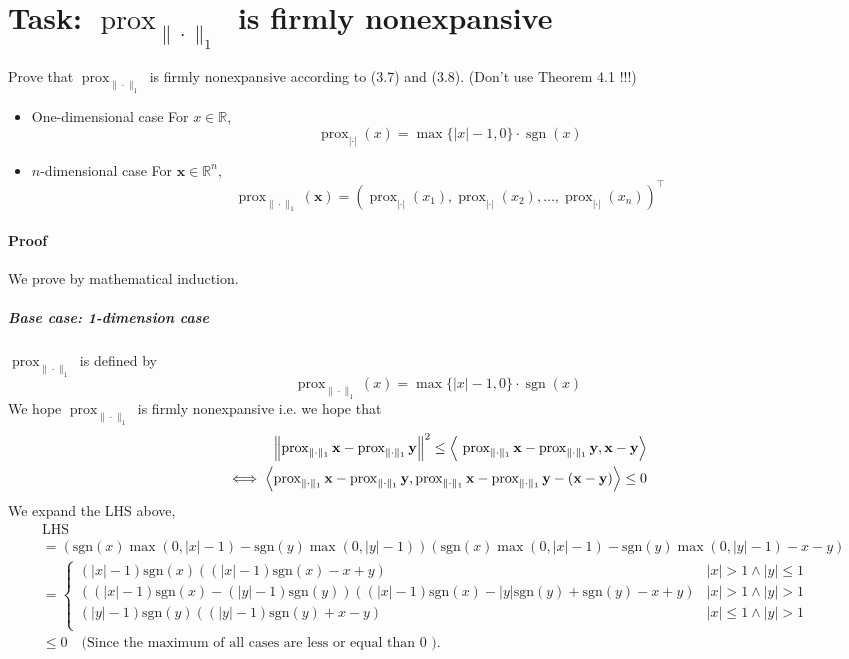 \documentclass[11pt]{article}
\def\bx{\bold x}
\def\by{\bold y}
\newcommand\norm[1]{\left\lVert#1\right\rVert}
\newcommand\vc[1]{\left\langle{#1}\right\rangle }
\def \pr{\operatorname{prox}_{\|\cdot\|_{1}}}
\begin{document}
\section{Task: $\operatorname{prox}_{\|\cdot\|_{1}}$ is firmly nonexpansive}  Prove that $\operatorname{prox}_{\|\cdot\|_{1}}$ is firmly nonexpansive according to (3.7) and (3.8). (Don't use Theorem 4.1 !!!)
\begin{itemize}
	\item One-dimensional case
For $x \in \mathbb{R}$,
$$
\operatorname{prox}_{|\cdot|}(x)=\max \{|x|-1,0\} \cdot \operatorname{sgn}(x)
$$
\item $n$-dimensional case
For $\boldsymbol{x} \in \mathbb{R}^{n}$,
$$
\operatorname{prox}_{\|\cdot\|_{1}}(\boldsymbol{x})=\left(\operatorname{prox}_{|\cdot|}\left(x_{1}\right), \operatorname{prox}_{|\cdot|}\left(x_{2}\right), \ldots, \operatorname{prox}_{|\cdot|}\left(x_{n}\right)\right)^{\top}
$$
\end{itemize}

\paragraph{Proof} We prove by mathematical induction.
\subparagraph{Base case: 1-dimension case}
$\pr$ is defined by
$$
\pr (x) = \max \{|x|-1,0\} \cdot \operatorname{sgn}(x)
$$
We hope $\pr$ is firmly nonexpansive i.e. we hope that
$$
\begin{aligned}
	\norm{\pr \bx - \pr \by}^2 \leq \vc{\ \pr \bx - \pr \by,\bx - \by} \\
\iff \vc{\pr \bx - \pr \by , \pr \bx - \pr \by - (\bx - \by ) }\leq 0
\end{aligned}
$$
We expand the LHS above,
$$
\begin{aligned}
	&\text{LHS} \\
	&= (\text{sgn}(x) \max (0,| x| -1)-\text{sgn}(y) \max (0,| y| -1)) (\text{sgn}(x) \max (0,| x| -1)-\text{sgn}(y) \max (0,| y| -1)-x-y) \\
	&=\begin{cases}
		 (| x| -1) \text{sgn}(x) ((| x| -1) \text{sgn}(x)-x+y) & | x| >1\land | y| \leq 1 \\
 ((| x| -1) \text{sgn}(x)-(| y| -1) \text{sgn}(y)) ((| x| -1) \text{sgn}(x)-| y|  \text{sgn}(y)+\text{sgn}(y)-x+y) & | x| >1\land | y| >1 \\
 (| y| -1) \text{sgn}(y) ((| y| -1) \text{sgn}(y)+x-y) & | x| \leq 1\land | y| >1 \\
	\end{cases}
 \\
 &\leq 0 \quad \text{(Since the maximum of all cases are less or equal than 0 ).}
\end{aligned}
$$
\end{document}
